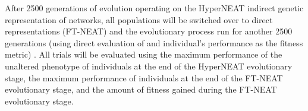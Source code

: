 After 2500 generations of evolution operating on the HyperNEAT indirect genetic representation of networks, all populations will be switched over to direct representations (FT-NEAT) and the evolutionary process run for another 2500 generations (using direct evaluation of and individual's performance as the fitness metric) \cite{Clune2011OnRegularity}. All trials will be evaluated using the maximum performance of the unaltered phenotype of individuals at the end of the HyperNEAT evolutionary stage, the maximum performance of individuals at the end of the FT-NEAT evolutionary stage, and the amount of fitness gained during the FT-NEAT evolutionary stage.





